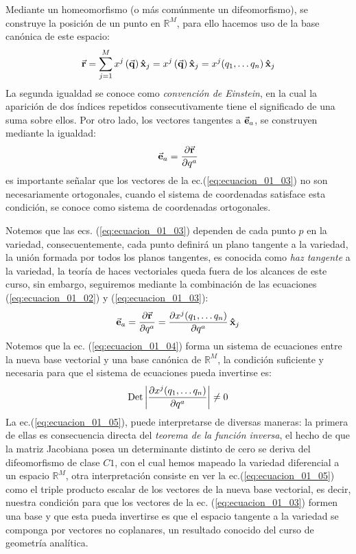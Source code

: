 \documentclass[12pt]{article}
\begin{document}
Mediante un homeomorfismo (o más comúnmente un difeomorfismo), se construye la posición de un punto en $\mathbb{R}^{M}$, para ello hacemos uso de la base canónica de este espacio:
\begin{align}
\va{r} = \sum_{j=1}^{M} x^{j} \, (\va{q}) \, \vu{x}_{j} = x^{j} \, (\va{q}) \, \vu{x}_{j} = x^{j} (q_{1}, \ldots q_{n}) \, \vu{x}_{j}
\label{eq:ecuacion_01_02}
\end{align}
La segunda igualdad se conoce como \emph{convención de Einstein}, en la cual la aparición de dos índices repetidos consecutivamente tiene el significado de una suma sobre ellos. Por otro lado, los vectores tangentes a $\va{e}_{a}$, se construyen mediante la igualdad:
\begin{align}
\va{e}_{a} = \pdv{\va{r}}{q^{a}}
\label{eq:ecuacion_01_03}
\end{align}
es importante señalar que los vectores de la ec.(\ref{eq:ecuacion_01_03}) no son necesariamente ortogonales, cuando el sistema de coordenadas satisface esta condición, se conoce como sistema de coordenadas ortogonales.
\par
Notemos que las ecs. (\ref{eq:ecuacion_01_03}) dependen de cada punto $p$ en la variedad, consecuentemente, cada punto definirá un plano tangente a la variedad, la unión formada por todos los planos tangentes, es conocida como \emph{haz tangente} a la variedad, la teoría de haces vectoriales queda fuera de los alcances de este curso, sin embargo, seguiremos mediante la combinación de las ecuaciones (\ref{eq:ecuacion_01_02}) y (\ref{eq:ecuacion_01_03}):
\begin{align}
\va{e}_{a} = \pdv{\va{r}}{q^{a}} = \pdv{x^{j} (q_{1}, \ldots q_{n})}{q^{a}} \, \vu{x}_{j}
\label{eq:ecuacion_01_04}
\end{align}
Notemos que la ec. (\ref{eq:ecuacion_01_04}) forma un sistema de ecuaciones entre la nueva base vectorial y una base canónica de $\mathbb{R}^{M}$, la condición suficiente y necesaria para que el sistema de ecuaciones pueda invertirse es:
\begin{align}
{\rm Det} \, \abs{\pdv{x^{j} (q_{1}, \ldots q_{n})}{q^{a}}} \neq 0
\label{eq:ecuacion_01_05}
\end{align}
La ec.(\ref{eq:ecuacion_01_05}), puede interpretarse de diversas maneras: la primera de ellas es consecuencia directa del \emph{teorema de la función inversa}, el hecho de que la matriz Jacobiana posea un determinante distinto de cero se deriva del difeomorfismo de clase $C1$, con el cual hemos mapeado la variedad diferencial a un espacio $\mathbb{R}^{M}$, otra interpretación consiste en ver la ec.(\ref{eq:ecuacion_01_05}) como el triple producto escalar de los vectores de la nueva base vectorial, es decir, nuestra condición para que los vectores de la ec. (\ref{eq:ecuacion_01_03})  formen una base y que esta pueda invertirse es que el espacio tangente a la variedad se componga por vectores no coplanares, un resultado conocido del curso de geometría analítica.
\end{document}
